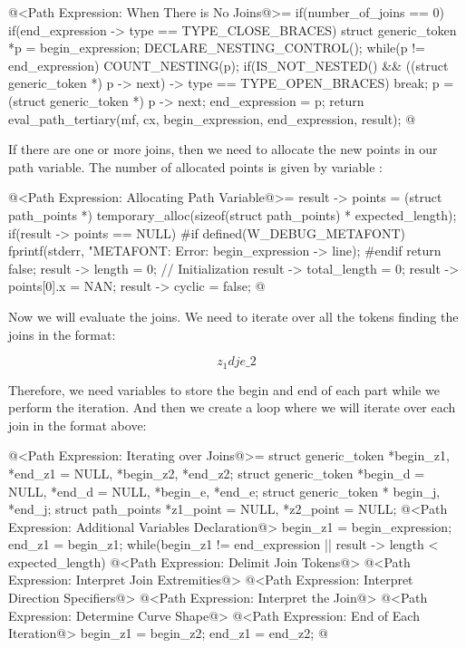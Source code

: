 \iniciocodigo
@<Path Expression: When There is No Joins@>=
if(number_of_joins == 0){
  if(end_expression -> type == TYPE_CLOSE_BRACES){
    struct generic_token *p = begin_expression;
    DECLARE_NESTING_CONTROL();
    while(p != end_expression){
      COUNT_NESTING(p);
      if(IS_NOT_NESTED() &&
         ((struct generic_token *) p -> next) -> type == TYPE_OPEN_BRACES)
        break;
      p = (struct generic_token *) p -> next;
    }
    end_expression = p;
  }
  return eval_path_tertiary(mf, cx, begin_expression, end_expression,
                           result);
}
@
\fimcodigo

If there are one or more joins, then we need to allocate the new
points in our path variable. The number of allocated points is given
by variable :

\iniciocodigo
@<Path Expression: Allocating Path Variable@>=
result -> points = (struct path_points *)
                     temporary_alloc(sizeof(struct path_points) *
                     expected_length);
if(result -> points == NULL){
#if defined(W_DEBUG_METAFONT)
  fprintf(stderr, "METAFONT: Error: %
          begin_expression -> line);
#endif
    return false;
}
result -> length = 0; // Initialization
result -> total_length = 0;
result -> points[0].x = NAN;
result -> cyclic = false;
@
\fimcodigo

Now we will evaluate the joins. We need to iterate over all the tokens
finding the joins in the format:

$$
z_1{d} j {e}\_2
$$

Therefore, we need variables to store the begin and end of each part
while we perform the iteration. And then we create a loop where we
will iterate over each join in the format above:

\iniciocodigo
@<Path Expression: Iterating over Joins@>=
{
  struct generic_token *begin_z1, *end_z1 = NULL, *begin_z2, *end_z2;
  struct generic_token *begin_d = NULL, *end_d = NULL, *begin_e, *end_e;
  struct generic_token * begin_j, *end_j;
  struct path_points *z1_point = NULL, *z2_point = NULL;
  @<Path Expression: Additional Variables Declaration@>
  begin_z1 = begin_expression;
  end_z1 = begin_z1;
  while(begin_z1 != end_expression || result -> length < expected_length){
    @<Path Expression: Delimit Join Tokens@>
    @<Path Expression: Interpret Join Extremities@>
    @<Path Expression: Interpret Direction Specifiers@>
    @<Path Expression: Interpret the Join@>
    @<Path Expression: Determine Curve Shape@>
    @<Path Expression: End of Each Iteration@>
    begin_z1 = begin_z2;
    end_z1 = end_z2;
  }
}
@
\fimcodigo

